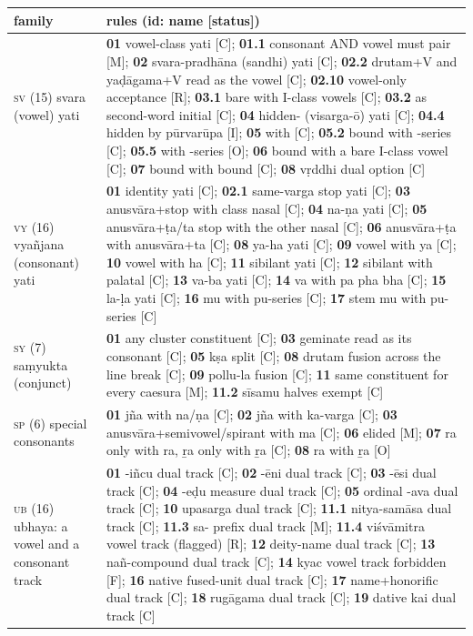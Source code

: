 {\centering\tiny\renewcommand{\arraystretch}{0.92}
\begin{tabularx}{\textwidth}{@{}>{\raggedright\arraybackslash}p{2.6cm}Y@{}}
\toprule
family & rules (id: name [status]) \\
\midrule
\textsc{sv} (15) svara (vowel) yati & \textbf{01} vowel-class yati [C]; \textbf{01.1} consonant AND vowel must pair [M]; \textbf{02} svara-pradhāna (sandhi) yati [C]; \textbf{02.2} drutam+V and yaḍāgama+V read as the vowel [C]; \textbf{02.10} vowel-only acceptance [R]; \textbf{03.1} bare  with I-class vowels [C]; \textbf{03.2}  as second-word initial [C]; \textbf{04} hidden- (visarga-ō) yati [C]; \textbf{04.4} hidden  by pūrvarūpa [I]; \textbf{05}  with  [C]; \textbf{05.2} bound  with -series [C]; \textbf{05.5}  with -series [O]; \textbf{06} bound  with a bare I-class vowel [C]; \textbf{07} bound  with bound  [C]; \textbf{08} vṛddhi dual option [C] \\
\textsc{vy} (16) vyañjana (consonant) yati & \textbf{01} identity yati [C]; \textbf{02.1} same-varga stop yati [C]; \textbf{03} anusvāra+stop with class nasal [C]; \textbf{04} na-ṇa yati [C]; \textbf{05} anusvāra+ṭa/ta stop with the other nasal [C]; \textbf{06} anusvāra+ṭa with anusvāra+ta [C]; \textbf{08} ya-ha yati [C]; \textbf{09} vowel with ya [C]; \textbf{10} vowel with ha [C]; \textbf{11} sibilant yati [C]; \textbf{12} sibilant with palatal [C]; \textbf{13} va-ba yati [C]; \textbf{14} va with pa pha bha [C]; \textbf{15} la-ḷa yati [C]; \textbf{16} mu with pu-series [C]; \textbf{17} stem mu with pu-series [C] \\
\textsc{sy} (7) saṃyukta (conjunct) & \textbf{01} any cluster constituent [C]; \textbf{03} geminate read as its consonant [C]; \textbf{05} kṣa split [C]; \textbf{08} drutam fusion across the line break [C]; \textbf{09} pollu-la fusion [C]; \textbf{11} same constituent for every caesura [M]; \textbf{11.2} sīsamu halves exempt [C] \\
\textsc{sp} (6) special consonants & \textbf{01} jña with na/ṇa [C]; \textbf{02} jña with ka-varga [C]; \textbf{03} anusvāra+semivowel/spirant with ma [C]; \textbf{06} elided  [M]; \textbf{07} ra only with ra, \b{r}a only with \b{r}a [C]; \textbf{08} ra with \b{r}a [O] \\
\textsc{ub} (16) ubhaya: a vowel and a consonant track & \textbf{01} -iñcu dual track [C]; \textbf{02} -ēni dual track [C]; \textbf{03} -ēsi dual track [C]; \textbf{04} -eḍu measure dual track [C]; \textbf{05} ordinal -ava dual track [C]; \textbf{10} upasarga dual track [C]; \textbf{11.1} nitya-samāsa dual track [C]; \textbf{11.3} sa- prefix dual track [M]; \textbf{11.4} viśvāmitra vowel track (flagged) [R]; \textbf{12} deity-name dual track [C]; \textbf{13} nañ-compound dual track [C]; \textbf{14} kyac vowel track forbidden [F]; \textbf{16} native fused-unit dual track [C]; \textbf{17} name+honorific dual track [C]; \textbf{18} rugāgama dual track [C]; \textbf{19} dative kai dual track [C] \\

\end{tabularx}}
